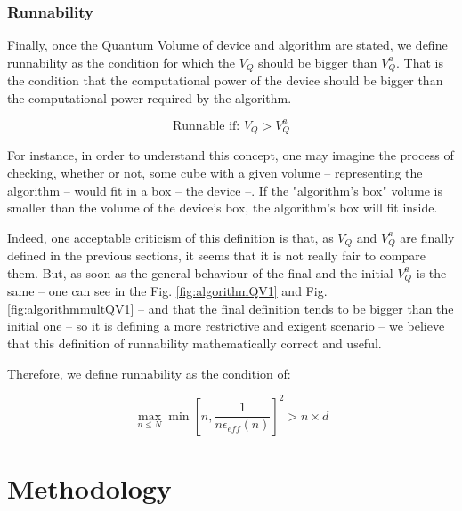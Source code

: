 \documentclass[11pt]{article}
\begin{document}
\subsubsection{Runnability}
\label{sec:orga4d6783}

Finally, once the Quantum Volume of device and algorithm are stated, we define runnability as the condition for which the \(V_Q\) should be bigger than \(V^a_Q\).
That is the condition that the computational power of the device should be bigger than the computational power required by the algorithm.

$$\text{Runnable if: } V_Q > V^a_Q$$

For instance, in order to understand this concept, one may imagine the process of checking, whether or not, some cube with a given volume -- representing the algorithm -- would fit in a box -- the device --.
If the "algorithm's box" volume is smaller than the volume of the device's box, the algorithm's box will fit inside.

Indeed, one acceptable criticism of this definition is that, as \(V_Q\) and \(V^a_Q\) are finally defined in the previous sections, it seems that it is not really fair to compare them.
But, as soon as the general behaviour of the final and the initial \(V^a_Q\) is the same -- one can see in the Fig. \ref{fig:algorithmQV1} and Fig. \ref{fig:algorithmmultQV1} -- and that the final definition tends to be bigger than the initial one -- so it is defining a more restrictive and exigent scenario -- we believe that this definition of runnability mathematically correct and useful.

Therefore, we define runnability as the condition of:

$$\max_{n \le N} \min \left[ n,\frac{1}{n \epsilon_{eff} (n)}\right]^2 > n \times d$$

\section{Methodology}
\label{sec:org15b16e6}



\end{document}
